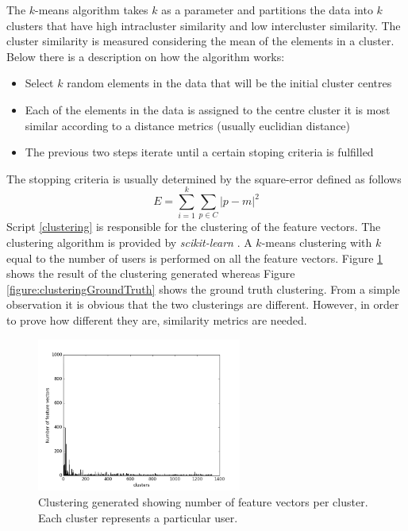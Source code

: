 \documentclass[11pt, oneside]{article}   	%
\begin{document}
The $k$-means algorithm takes $k$ as a parameter and partitions the data into $k$ clusters that have high intracluster similarity and low intercluster similarity. The cluster similarity is measured considering the mean of the elements in a cluster. Below there is a description on how the algorithm works:
\begin{itemize}
	\item Select $k$ random elements in the data that will be the initial cluster centres
	\item Each of the elements in the data is assigned to the centre cluster it is most similar according to a distance metrics (usually euclidian distance)
	\item The previous two steps iterate until a certain stoping criteria is fulfilled
\end{itemize}
The stopping criteria is usually determined by the square-error defined as follows $$E=\sum\limits_{i=1}^k\sum\limits_{p\in C}|p-m|^2$$
Script \ref{clustering} is responsible for the clustering of the feature vectors. The clustering algorithm is provided by {\it scikit-learn} \cite{scikit}. A $k$-means clustering with $k$ equal to the number of users is performed on all the feature vectors. Figure \ref{figure:clusteringGenerated} shows the result of the clustering generated whereas Figure \ref{figure:clusteringGroundTruth} shows the ground truth clustering. From a simple observation it is obvious that the two clusterings are different. However, in order to prove how different they are, similarity metrics are needed.
\begin{figure}[h!]
  \centering
    \includegraphics[width=0.6\textwidth]{./pythonScripts/histClusterGenerated.png}
      \caption{Clustering generated showing number of feature vectors per cluster. Each cluster represents a particular user.}
      \label{figure:clusteringGenerated}
\end{figure}
\end{document}
